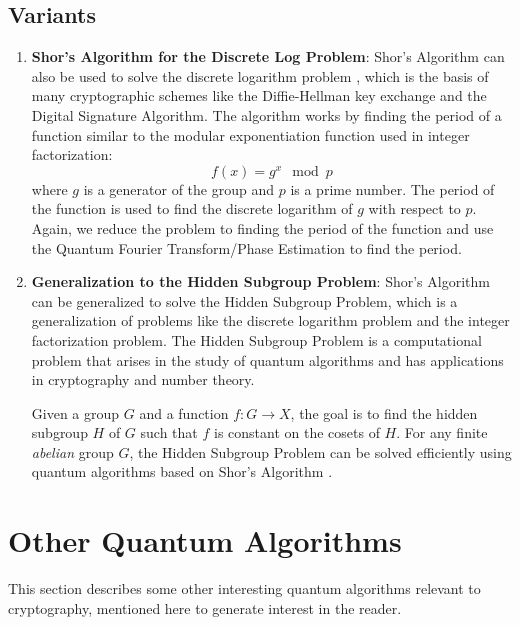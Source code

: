 \documentclass[12pt]{article}
\begin{document}
\subsection{Variants}
\begin{enumerate}
    \item \textbf{Shor's Algorithm for the Discrete Log Problem}: Shor's Algorithm can also be used to solve the discrete logarithm problem \cite{dl}, which is the basis of many cryptographic schemes like the Diffie-Hellman key exchange and the Digital Signature Algorithm. The algorithm works by finding the period of a function similar to the modular exponentiation function used in integer factorization:
    $$f(x) = g^x \mod p$$
    where $g$ is a generator of the group and $p$ is a prime number. The period of the function is used to find the discrete logarithm of $g$ with respect to $p$. Again, we reduce the problem to finding the period of the function and use the Quantum Fourier Transform/Phase Estimation to find the period.
    \item \textbf{Generalization to the Hidden Subgroup Problem}: Shor's Algorithm can be generalized to solve the Hidden Subgroup Problem, which is a generalization of problems like the discrete logarithm problem and the integer factorization problem. The Hidden Subgroup Problem is a computational problem that arises in the study of quantum algorithms and has applications in cryptography and number theory.
    \par\noindent Given a group $G$ and a function $f: G \rightarrow X$, the goal is to find the hidden subgroup $H$ of $G$ such that $f$ is constant on the cosets of $H$. For any finite \textit{abelian} group $G$, the Hidden Subgroup Problem can be solved efficiently using quantum algorithms based on Shor's Algorithm \cite{qcqi}.
\end{enumerate}

\section{Other Quantum Algorithms}
This section describes some other interesting quantum algorithms relevant to cryptography, mentioned here to generate interest in the reader. 
\end{document}
